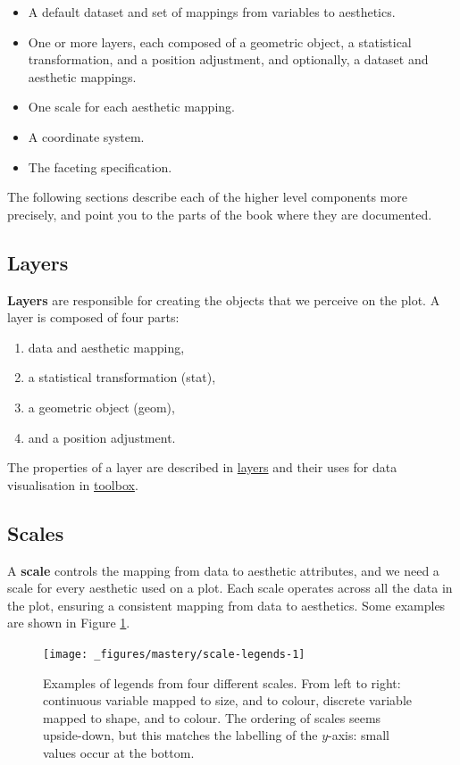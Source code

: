 \begin{itemize}
\item
  A default dataset and set of mappings from variables to aesthetics.
\item
  One or more layers, each composed of a geometric object, a statistical
  transformation, and a position adjustment, and optionally, a dataset
  and aesthetic mappings.
\item
  One scale for each aesthetic mapping.
\item
  A coordinate system.
\item
  The faceting specification.
\end{itemize}

The following sections describe each of the higher level components more
precisely, and point you to the parts of the book where they are
documented.

\subsection{Layers}

\textbf{Layers} are responsible for creating the objects that we
perceive on the plot. A layer is composed of four parts:

\begin{enumerate}
\def\labelenumi{\arabic{enumi}.}
\itemsep1pt\parskip0pt
\item
  data and aesthetic mapping,
\item
  a statistical transformation (stat),
\item
  a geometric object (geom),
\item
  and a position adjustment.
\end{enumerate}

The properties of a layer are described in \hyperref[cha:layers]{layers}
and their uses for data visualisation in
\hyperref[cha:toolbox]{toolbox}.

\subsection{Scales}\label{sub:scales}

A \textbf{scale} controls the mapping from data to aesthetic attributes,
and we need a scale for every aesthetic used on a plot. Each scale
operates across all the data in the plot, ensuring a consistent mapping
from data to aesthetics. Some examples are shown in Figure
\ref{fig:scale-legends}.

\begin{figure}[H]
  \texttt{[image: \_figures/mastery/scale-legends-1]}
  \caption{Examples of legends from four different scales. From left to right: continuous variable mapped to size, and to colour, discrete variable mapped to shape, and to colour. The ordering of scales seems upside-down, but this matches the labelling of the $y$-axis: small values occur at the bottom.}
  \label{fig:scale-legends}
\end{figure}


